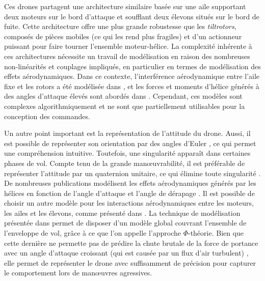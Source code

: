 Ces drones partagent une architecture similaire basée sur une aile supportant deux moteurs sur le bord d'attaque et soufflant deux élevons situés sur le bord de fuite. Cette architecture offre une plus grande robustesse que les \textit{tiltrotors}, composés de pièces mobiles (ce qui les rend plus fragiles) et d'un actionneur puissant pour faire tourner l'ensemble moteur-hélice.
La complexité inhérente à ces architectures nécessite un travail de modélisation en raison des nombreuses non-linéarités et couplages impliqués, en particulier en termes de modélisation des effets aérodynamiques. Dans ce contexte, l'interférence aérodynamique entre l'aile fixe et les rotors a été modélisée dans \cite{droandi_zanotti_gibertini_grassi_campanardi_2015, Simmons2022, aerospace5030079}, et les forces et moments d'hélice générés à des angles d'attaque élevés sont abordés dans \cite{Fernandez2023}. Cependant, ces modèles sont complexes algorithmiquement et ne sont que partiellement utilisables pour la conception des commandes. 

Un autre point important est la représentation de l'attitude du drone. Aussi, il est possible de représenter son orientation par des angles d'Euler \cite{4177650, 5415267, 8003165}, ce qui permet une compréhension intuitive. Toutefois, une singularité apparaît dans certaines phases de vol. Compte tenu de la grande manœuvrabilité, il est préférable de représenter l'attitude par un quaternion unitaire, ce qui élimine toute singularité \cite{8027691}. De nombreuses publications modélisent les effets aérodynamiques générés par les hélices en fonction de l'angle d'attaque et l'angle de dérapage \cite{Escareno07, ChiappinelliNahon2018}. 
Il est possible de choisir un autre modèle pour les interactions aérodynamiques entre les moteurs, les ailes et les élevons, comme présenté dans \cite{lustosaHal-03035938}. La technique de modélisation présentée dans \cite{lustosaHal-03035938} permet de disposer d'un modèle global couvrant l'ensemble de l'enveloppe de vol, grâce à ce que l'on appelle l'approche $\Phi$-théorie. Bien que cette dernière ne permette pas de prédire la chute brutale de la force de portance avec un angle d'attaque croissant (qui est causée par un flux d'air turbulent) \cite{tal2022global}, elle permet de représenter le drone avec suffisamment de précision pour capturer le comportement lors de manœuvres agressives. 




